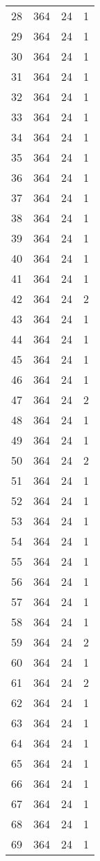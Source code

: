 \begin{longtable}[!]{c|ccc}
	28	& 364	& 24	& 1	\\
	29	& 364	& 24	& 1	\\
	30	& 364	& 24	& 1	\\
	31	& 364	& 24	& 1	\\
	32	& 364	& 24	& 1	\\
	33	& 364	& 24	& 1	\\
	34	& 364	& 24	& 1	\\
	35	& 364	& 24	& 1	\\
	36	& 364	& 24	& 1	\\
	37	& 364	& 24	& 1	\\
	38	& 364	& 24	& 1	\\
	39	& 364	& 24	& 1	\\
	40	& 364	& 24	& 1	\\
	41	& 364	& 24	& 1	\\
	42	& 364	& 24	& 2	\\
	43	& 364	& 24	& 1	\\
	44	& 364	& 24	& 1	\\
	45	& 364	& 24	& 1	\\
	46	& 364	& 24	& 1	\\
	47	& 364	& 24	& 2	\\
	48	& 364	& 24	& 1	\\
	49	& 364	& 24	& 1	\\
	50	& 364	& 24	& 2	\\
	51	& 364	& 24	& 1	\\
	52	& 364	& 24	& 1	\\
	53	& 364	& 24	& 1	\\
	54	& 364	& 24	& 1	\\
	55	& 364	& 24	& 1	\\
	56	& 364	& 24	& 1	\\
	57	& 364	& 24	& 1	\\
	58	& 364	& 24	& 1	\\
	59	& 364	& 24	& 2	\\
	60	& 364	& 24	& 1	\\
	61	& 364	& 24	& 2	\\
	62	& 364	& 24	& 1	\\
	63	& 364	& 24	& 1	\\
	64	& 364	& 24	& 1	\\
	65	& 364	& 24	& 1	\\
	66	& 364	& 24	& 1	\\
	67	& 364	& 24	& 1	\\
	68	& 364	& 24	& 1	\\
	69	& 364	& 24	& 1	\\

\end{longtable}
